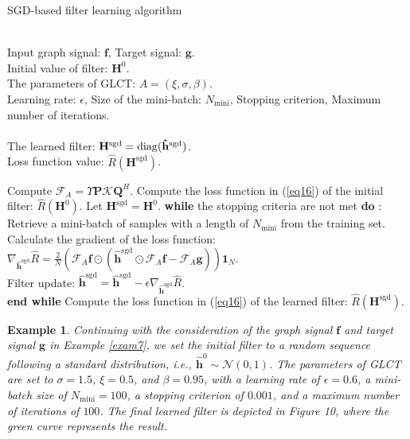 \documentclass[lettersize,journal]{IEEEtran}
\newtheorem{example}{Example}
\begin{document}
\begin{algorithm}[!h]
	\label{algo2}
	\caption{SGD-based filter learning algorithm}%
	\begin{algorithmic}[1]%
		\REQUIRE ~~\\
		Input graph signal: $\mathbf{f}$,  Target signal: $\mathbf{g}$.\\
		Initial value of filter: $\mathbf{H}^0$. \\
		The parameters of GLCT: $A=(\xi, \sigma, \beta)$. \\
		Learning rate: $\epsilon$, Size of the mini-batch: $N_{\text{mini}}$, Stopping criterion, Maximum number of iterations.\\
		\ENSURE ~~\\
		The learned filter: $\mathbf{H}^{\text{sgd}}={\rm diag}(\mathbf{\hat{h}}^{\text{sgd}})$.\\
		Loss function value: $\hat{R}(\mathbf{H}^{\text{sgd}})$.
		
		\STATE Compute $\mathcal{F}_{A} =  \Upsilon \mathbf{P} \mathcal{K} \mathbf{Q}^H$.
		\STATE Compute the loss function in (\ref{eq16}) of the initial filter: $\hat{R}(\mathbf{H}^0)$.
		\STATE Let $\mathbf{H}^{\text{sgd}}=\mathbf{H}^0$.
		\STATE \textbf{while} the stopping criteria are not met \textbf{do} :\\
		       Retrieve a mini-batch of samples with a length of $N_{\text{mini}}$ from the training set. \\
		        Calculate the gradient of the loss function:     
		        $\nabla_{\mathbf{\hat{h}}^{\text{sgd}}} \hat{R} = \frac{2}{N} \left(\mathcal{F}_{A} \mathbf{f} \odot (\mathbf{\hat{h}}^{\text{sgd}} \odot \mathcal{F}_{A} \mathbf{f} - \mathcal{F}_{A} \mathbf{g} ) \right) \mathbf{1}_N$. \\
		        Filter update: $\hat{\mathbf{h}}^{\text{sgd}}=\hat{\mathbf{h}}^{\text{sgd}}-\epsilon \nabla_{\mathbf{\hat{h}}^{\text{sgd}}} \hat{R} $. \\
		         \textbf{end while}
		 \STATE Compute the loss function in (\ref{eq16}) of the learned filter: $\hat{R}(\mathbf{H}^{\text{sgd}})$.
	\end{algorithmic}
\end{algorithm}

\begin{example}
	Continuing with the consideration of the graph signal $\mathbf{f}$ and target signal $\mathbf{g}$ in Example \ref{exam7}, we set the initial filter to a random sequence following a standard distribution, i.e., $\hat{\mathbf{h}}^0 \sim \mathcal{N}(0, 1)$.
	The parameters of GLCT are set to $\sigma=1.5$, $\xi=0.5$, and $\beta=0.95$, with a learning rate of $\epsilon=0.6$, a mini-batch size of $N_{\text{mini}}=100$, a stopping criterion of $0.001$, and a maximum number of iterations of $100$. 
	The final learned filter is depicted in Figure 10, where the green curve represents the result.
\end{example}
\end{document}
